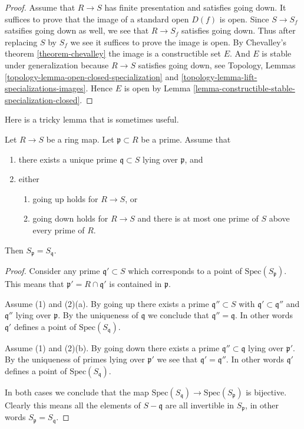\begin{proof}
Assume that $R \to S$ has finite presentation and satisfies
going down.
It suffices to prove that the image of a standard open $D(f)$ is open.
Since $S \to S_f$ satsifies going down as well, we see that
$R \to S_f$ satisfies going down. Thus after replacing
$S$ by $S_f$ we see it suffices to prove the image is
open. By Chevalley's theorem \ref{theorem-chevalley}
the image is a constructible set $E$. And $E$ is stable
under generalization because $R \to S$ satisfies going down,
see Topology, Lemmas \ref{topology-lemma-open-closed-specialization}
and \ref{topology-lemma-lift-specializations-images}.
Hence $E$ is open by
Lemma \ref{lemma-constructible-stable-specialization-closed}.
\end{proof}

\noindent
Here is a tricky lemma that is sometimes useful.

\begin{lemma}
\label{lemma-unique-prime-over-localize-below}
Let $R \to S$ be a ring map.
Let $\mathfrak p \subset R$ be a prime.
Assume that
\begin{enumerate}
\item there exists a unique prime $\mathfrak q \subset S$ lying over
$\mathfrak p$, and
\item either
\begin{enumerate}
\item going up holds for $R \to S$, or
\item going down holds for $R \to S$ and there is at most one prime
of $S$ above every prime of $R$.
\end{enumerate}
\end{enumerate}
Then $S_{\mathfrak p} = S_{\mathfrak q}$.
\end{lemma}

\begin{proof}
Consider any prime $\mathfrak q' \subset S$ which corresponds to
a point of $\text{Spec}(S_{\mathfrak p})$. This means that
$\mathfrak p' = R \cap \mathfrak q'$ is contained in $\mathfrak p$.

\medskip\noindent
Assume (1) and (2)(a).
By going up there exists a prime $\mathfrak q'' \subset S$
with $\mathfrak q' \subset \mathfrak q''$ and $\mathfrak q''$
lying over $\mathfrak p$. By the uniqueness of $\mathfrak q$ we
conclude that $\mathfrak q'' = \mathfrak q$. In other words
$\mathfrak q'$ defines a point of $\text{Spec}(S_{\mathfrak q})$.

\medskip\noindent
Assume (1) and (2)(b).
By going down there exists a prime $\mathfrak q'' \subset \mathfrak q$
lying over $\mathfrak p'$. By the uniqueness of primes lying over
$\mathfrak p'$ we see that $\mathfrak q' = \mathfrak q''$.  In other words
$\mathfrak q'$ defines a point of $\text{Spec}(S_{\mathfrak q})$.

\medskip\noindent
In both cases we conclude that the map
$\text{Spec}(S_{\mathfrak q}) \to \text{Spec}(S_{\mathfrak p})$
is bijective. Clearly this means all the elements of $S - \mathfrak q$
are all invertible in $S_{\mathfrak p}$, in other words
$S_{\mathfrak p} = S_{\mathfrak q}$.
\end{proof}





